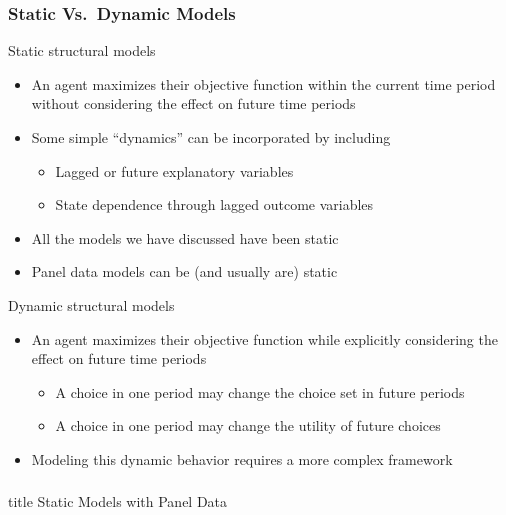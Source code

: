 \documentclass{beamer}
\begin{document}
\begin{frame}\frametitle{Static Vs.\ Dynamic Models}
    Static structural models
    \begin{itemize}
    	\item An agent maximizes their objective function within the current time period without considering the effect on future time periods
    	\item Some simple ``dynamics'' can be incorporated by including
    	\begin{itemize}
    		\item Lagged or future explanatory variables
    		\item State dependence through lagged outcome variables
    	\end{itemize}
    	\item All the models we have discussed have been static
    	\item Panel data models can be (and usually are) static
    \end{itemize}
    \vspace{2ex}
    Dynamic structural models
    \begin{itemize}
    	\item An agent maximizes their objective function while explicitly considering the effect on future time periods
    	\begin{itemize}
    		\item A choice in one period may change the choice set in future periods
    		\item A choice in one period may change the utility of future choices
    	\end{itemize}
    	\item Modeling this dynamic behavior requires a more complex framework
    \end{itemize}
\end{frame}

\begin{frame}\frametitle{}
    \vfill
    \centering
    \begin{beamercolorbox}[center]{title}
        \Large Static Models with Panel Data
    \end{beamercolorbox}
    \vfill
\end{frame}
\end{document}
